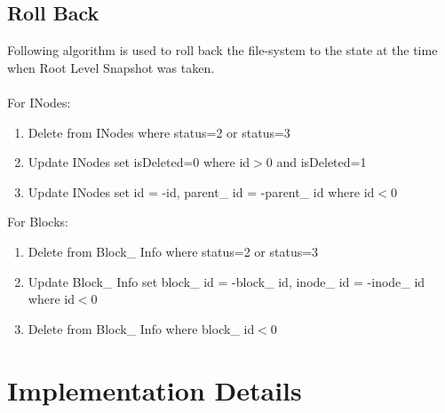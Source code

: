 \subsection{Roll Back}
 Following algorithm is used to roll back the file-system to the state at the time when Root Level Snapshot was taken.\\\\
For INodes:
\begin{enumerate}
\item Delete from INodes where status=2 or status=3
\item Update INodes set isDeleted=0 where id$>$0 and isDeleted=1
\item Update INodes set id = -id, parent\_ id = -parent\_ id where id$<$0
\end{enumerate}
For Blocks:
\begin{enumerate}
\item Delete from Block\_ Info where status=2 or status=3
\item Update Block\_ Info set block\_ id = -block\_ id, inode\_ id = -inode\_ id where id$<$0
\item Delete from Block\_ Info where block\_ id$<$0
\end{enumerate}
\label{alg:ROSSRB}

\section{Implementation Details}

